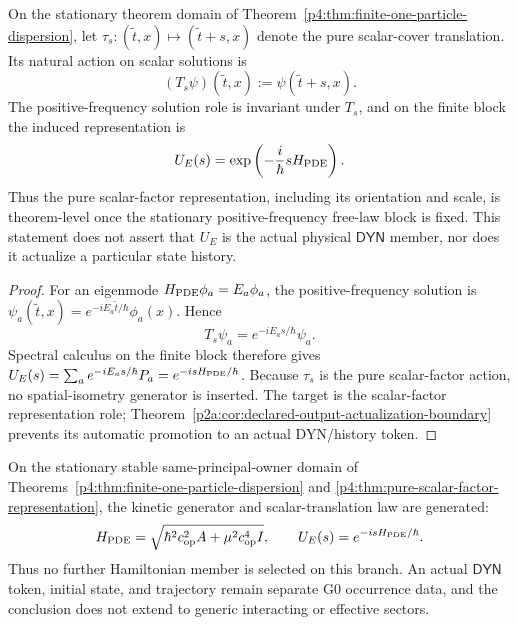 \documentclass[12pt,a4paper]{article}
\begin{document}
\begin{theorem}
\label{p4:thm:pure-scalar-factor-representation}
On the stationary theorem domain of
Theorem~\ref{p4:thm:finite-one-particle-dispersion}, let
\(\tau_s:(\widetilde t,x)\mapsto(\widetilde t+s,x)\) denote the pure
scalar-cover translation.  Its natural action on scalar solutions is
\[
  (T_s\psi)(\widetilde t,x):=\psi(\widetilde t+s,x).
\]
The positive-frequency solution role is invariant under \(T_s\), and on the
finite block the induced representation is
\begin{equation}
\label{p4:eq:pure-scalar-factor-unitary}
  U_E(s)=\exp\left(-\frac{i}{\hbar}sH_{\rm PDE}\right).
\end{equation}
Thus the pure scalar-factor representation, including its orientation and scale,
is theorem-level once the stationary positive-frequency free-law block is
fixed.  This statement does not assert that \(U_E\) is the actual physical
\(\mathsf{DYN}\) member, nor does it actualize a particular state history.
\end{theorem}

\begin{proof}
For an eigenmode \(H_{\rm PDE}\phi_a=E_a\phi_a\), the positive-frequency
solution is \(\psi_a(\widetilde t,x)=e^{-iE_a\widetilde t/\hbar}\phi_a(x)\).
Hence
\[
 T_s\psi_a=e^{-iE_as/\hbar}\psi_a.
\]
Spectral calculus on the finite block therefore gives
\(U_E(s)=\sum_a e^{-iE_as/\hbar}P_a=e^{-isH_{\rm PDE}/\hbar}\).
Because \(\tau_s\) is the pure scalar-factor action, no spatial-isometry
generator is inserted.  The target is the scalar-factor representation role;
Theorem~\ref{p2a:cor:declared-output-actualization-boundary} prevents its
automatic promotion to an actual DYN/history token.
\end{proof}

\begin{corollary}
\label{p4:cor:stationary-free-law-dyn-law-closure}
On the stationary stable same-principal-owner domain of
Theorems~\ref{p4:thm:finite-one-particle-dispersion} and
\ref{p4:thm:pure-scalar-factor-representation}, the kinetic generator and
scalar-translation law are generated:
\[
 H_{\rm PDE}
 =\sqrt{\hbar^2c_{\rm op}^2A+\mu^2c_{\rm op}^4I},
 \qquad
 U_E(s)=e^{-isH_{\rm PDE}/\hbar}.
\]
Thus no further Hamiltonian member is selected on this branch.  An actual
\(\mathsf{DYN}\) token, initial state, and trajectory remain separate G0
occurrence data, and the conclusion does not extend to generic interacting or
effective sectors.
\end{corollary}
\end{document}
